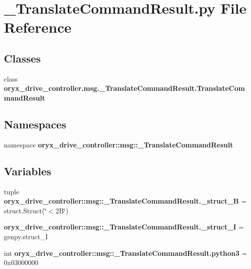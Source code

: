 \section{\-\_\-\-Translate\-Command\-Result.\-py \-File \-Reference}
\label{__TranslateCommandResult_8py}
\subsection*{\-Classes}
\begin{DoxyCompactItemize}
\item 
class {\bf oryx\-\_\-drive\-\_\-controller.\-msg.\-\_\-\-Translate\-Command\-Result.\-Translate\-Command\-Result}
\end{DoxyCompactItemize}
\subsection*{\-Namespaces}
\begin{DoxyCompactItemize}
\item 
namespace {\bf oryx\-\_\-drive\-\_\-controller\-::msg\-::\-\_\-\-Translate\-Command\-Result}
\end{DoxyCompactItemize}
\subsection*{\-Variables}
\begin{DoxyCompactItemize}
\item 
tuple {\bf oryx\-\_\-drive\-\_\-controller\-::msg\-::\-\_\-\-Translate\-Command\-Result.\-\_\-struct\-\_\-B} = struct.\-Struct(\char`\"{}$<$2\-B\char`\"{})
\item 
{\bf oryx\-\_\-drive\-\_\-controller\-::msg\-::\-\_\-\-Translate\-Command\-Result.\-\_\-struct\-\_\-\-I} = genpy.\-struct\-\_\-\-I
\item 
int {\bf oryx\-\_\-drive\-\_\-controller\-::msg\-::\-\_\-\-Translate\-Command\-Result.\-python3} = 0x03000000
\end{DoxyCompactItemize}
